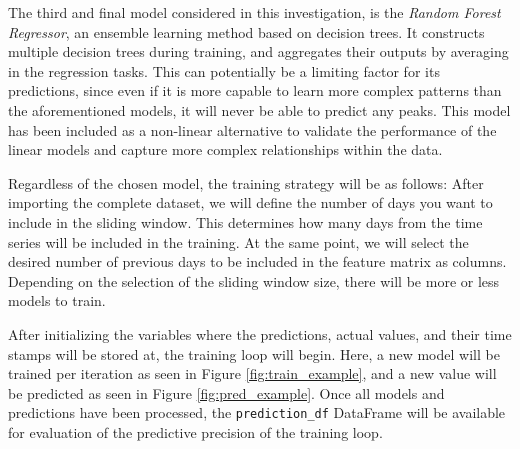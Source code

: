 \documentclass[12pt]{report} %
\begin{document}


The third and final model considered in this investigation, is the \textit{Random Forest Regressor}, an ensemble learning method based on decision trees. It constructs multiple decision trees during training, and aggregates their outputs by averaging in the regression tasks. This can potentially be a limiting factor for its predictions, since even if it is more capable to learn more complex patterns than the aforementioned models, it will never be able to predict any peaks. This model has been included as a non-linear alternative to validate the performance of the linear models and capture more complex relationships within the data.



Regardless of the chosen model, the training strategy will be as follows: After importing the complete dataset, we will define the number of days you want to include in the sliding window. This determines how many days from the time series will be included in the training. At the same point, we will select the desired number of previous days to be included in the feature matrix as columns. Depending on the selection of the sliding window size, there will be more or less models to train.

After initializing the variables where the predictions, actual values, and their time stamps will be stored at, the training loop will begin. Here, a new model will be trained per iteration as seen in Figure \ref{fig:train_example}, and a new value will be predicted as seen in Figure \ref{fig:pred_example}. Once all models and predictions have been processed, the \small{\verb|prediction_df|} DataFrame will be available for evaluation of the predictive precision of the training loop.
\end{document}
